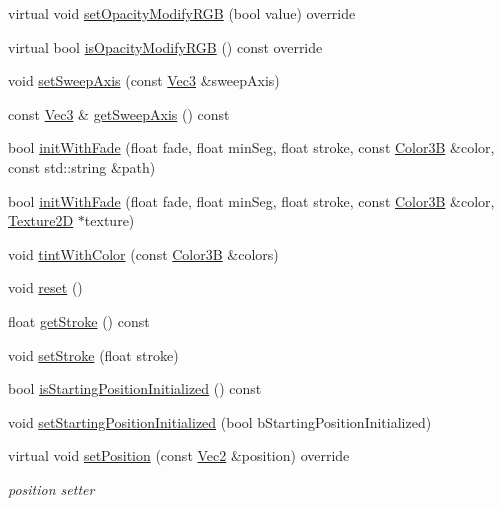 \begin{DoxyCompactItemize}
\item 
virtual void \hyperlink{classMotionStreak3D_ac4ef49b3087c63f5cea40efe91d4f271}{set\+Opacity\+Modify\+R\+GB} (bool value) override
\item 
virtual bool \hyperlink{classMotionStreak3D_a6b513fcdb7b462e2a28bb67e3dd35836}{is\+Opacity\+Modify\+R\+GB} () const override
\item 
void \hyperlink{classMotionStreak3D_a1d9e11935a4992f5c475d13d955c6578}{set\+Sweep\+Axis} (const \hyperlink{classVec3}{Vec3} \&sweep\+Axis)
\item 
const \hyperlink{classVec3}{Vec3} \& \hyperlink{classMotionStreak3D_aa6cd925496130156b4aadf09bcfc9b32}{get\+Sweep\+Axis} () const
\item 
bool \hyperlink{classMotionStreak3D_aeb508d5a9a772ca2f87a195a92631501}{init\+With\+Fade} (float fade, float min\+Seg, float stroke, const \hyperlink{structColor3B}{Color3B} \&color, const std\+::string \&path)
\item 
bool \hyperlink{classMotionStreak3D_a6b99e3a23ebf47e35f83a9cab843ee9d}{init\+With\+Fade} (float fade, float min\+Seg, float stroke, const \hyperlink{structColor3B}{Color3B} \&color, \hyperlink{classTexture2D}{Texture2D} $\ast$texture)
\item 
void \hyperlink{classMotionStreak3D_a5c79a196ddadb3a869da49e3d501bb24}{tint\+With\+Color} (const \hyperlink{structColor3B}{Color3B} \&colors)
\item 
void \hyperlink{classMotionStreak3D_af626dc0c3699973f3d051a4771bbf8a5}{reset} ()
\item 
float \hyperlink{classMotionStreak3D_a6bb96d9a0dceaa6d4fa56b6c93c0a9b0}{get\+Stroke} () const
\item 
void \hyperlink{classMotionStreak3D_a7e5feedbf87874e24710d564d16d4649}{set\+Stroke} (float stroke)
\item 
bool \hyperlink{classMotionStreak3D_a886e755c13fabbeab8f326b512289ade}{is\+Starting\+Position\+Initialized} () const
\item 
void \hyperlink{classMotionStreak3D_a62b248c1dd60a576a0a471da62e3b5de}{set\+Starting\+Position\+Initialized} (bool b\+Starting\+Position\+Initialized)
\item 
virtual void \hyperlink{classMotionStreak3D_a070710f82d947115207e9bfc0eeb4d30}{set\+Position} (const \hyperlink{classVec2}{Vec2} \&position) override
\begin{DoxyCompactList}\small\item\em position setter \end{DoxyCompactList}\item 

\end{DoxyCompactItemize}
